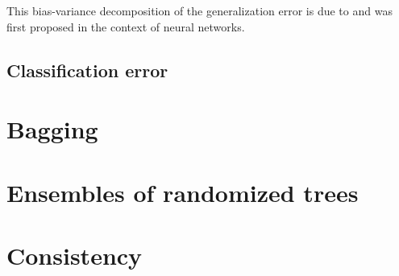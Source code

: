 This bias-variance decomposition of the generalization error is due to
\citet{geman:1992} and was first proposed in the context of neural networks.

\subsection{Classification error}

\section{Bagging}
\label{sec:4:bagging}




\section{Ensembles of randomized trees}
\label{sec:4:ensemble}







\section{Consistency}
\label{sec:4:consistency}

